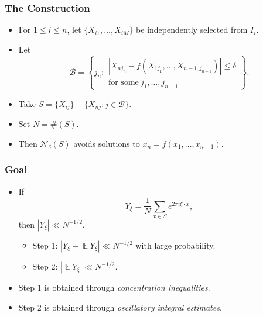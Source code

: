 \documentclass[handout,usenames,dvipsnames]{beamer}
\DeclareMathOperator{\EE}{\mathbb{E}}
\begin{document}
\begin{frame}
    \frametitle{The Construction}

    \begin{itemize}
        \item For $1 \leq i \leq n$, let $\{ X_{i1}, \dots, X_{iM} \}$ be independently selected from $I_i$.
        \item Let
        \[ \mathcal{B} = \left\{ j_n: \begin{array}{c} |X_{nj_n} - f(X_{1j_1}, \dots, X_{n-1,j_{n-1}})| \leq \delta \\ \text{for some}\ j_1,\dots,j_{n-1} \end{array} \right\}. \]
        \item Take $S = \{ X_{ij} \} - \{ X_{nj} : j \in \mathcal{B} \}$.
        \item Set $N = \#(S)$.
        \item Then $\mathcal{N}_\delta(S)$ avoids solutions to $x_n = f(x_1,\dots,x_{n-1})$.
    \end{itemize}
\end{frame}

\begin{frame}
    \frametitle{Goal}

    \begin{itemize}
    \item If
    \[ Y_\xi = \frac{1}{N} \sum_{x \in S} e^{2 \pi i \xi \cdot x}, \]
    then $|Y_\xi| \ll N^{-1/2}$.

    \begin{itemize}
        \item Step 1: $|Y_\xi - \EE Y_\xi | \ll N^{-1/2}$ with large probability.
        \item Step 2: $|\EE Y_\xi| \ll N^{-1/2}$.
    \end{itemize}

    \item Step 1 is obtained through \emph{concentration inequalities}.
    \item Step 2 is obtained through \emph{oscillatory integral estimates}.

    \end{itemize}
\end{frame}
\end{document}
